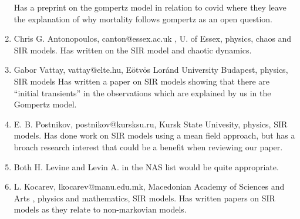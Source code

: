 \documentclass[11pt,a4paper,roman]{moderncv}
\begin{document}
\begin{enumerate}
Has a preprint on the gompertz model in relation to covid where they leave the explanation of why mortality follows gompertz as an open question.
\item Chris G. Antonopoulos, canton@essex.ac.uk , U. of Essex, physics, chaos and SIR models.
Has written on the SIR model and chaotic dynamics.
\item Gabor Vattay, vattay@elte.hu, Eötvös Loránd University Budapest, physics, SIR models
Has written a paper on SIR models showing that there are ``initial transients'' in the observations which are explained by us in the Gompertz model.
\item E. B. Postnikov, postnikov@kursksu.ru, Kursk State Univesity, physics, SIR models.
Has done work on SIR models using a mean field approach, but has a broach research interest that could be a benefit when reviewing our paper.
\item Both H. Levine and Levin A. in the NAS list would be quite appropriate.
\item L. Kocarev, lkocarev@manu.edu.mk, Macedonian Academy of Sciences and Arts
, physics and mathematics, SIR models.
Has written papers on SIR models as they relate to non-markovian models.




\end{enumerate} 
\end{document}
